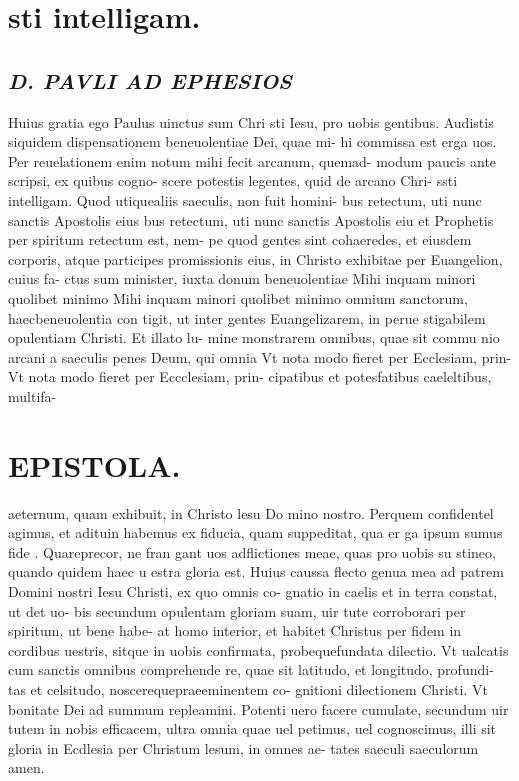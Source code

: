 \documentclass{article}
\begin{document}
\begin{pages}
\section*{sti intelligam. }
\marginpar{[ p.1. ]}
{}
\subsection*{\textit{D. PAVLI AD EPHESIOS }}\pstart Huius gratia ego Paulus uinctus sum Chri sti Iesu, pro uobis gentibus.  Audistis siquidem dispensationem beneuolentiae Dei, quae mi- hi commissa est erga uos. Per reuelationem enim notum mihi fecit arcanum, quemad- modum paucis ante scripsi, ex quibus  cogno- scere potestis legentes, quid de arcano Chri- ssti intelligam.  \pend\pstart Quod utiquealiis saeculis, non fuit homini- bus retectum, uti nunc sanctis Apostolis eius bus retectum, uti nunc sanctis Apostolis eiu et Prophetis per spiritum retectum est, nem- pe quod gentes sint cohaeredes, et eiusdem corporis, atque participes promissionis eius, in Christo exhibitae per Euangelion, cuius fa- ctus sum minister, iuxta donum beneuolentiae  \pend\pstart Mihi inquam minori quolibet minimo Mihi inquam minori quolibet minimo omnium sanctorum, haecbeneuolentia con tigit, ut inter gentes Euangelizarem, in perue stigabilem opulentiam Christi. Et illato lu- mine monstrarem omnibus, quae sit commu nio arcani a saeculis penes Deum, qui omnia  \pend\pstart Vt nota modo fieret per Ecclesiam, prin- Vt nota modo fieret per Eccclesiam, prin- cipatibus et potesfatibus caeleltibus, multifa-  \pend
\section*{EPISTOLA.  }
\marginpar{[ p.12 ]}
\marginpar{[ p.5.  ]}
\marginpar{[ p.6.  ]}
\marginpar{[ p.7. ]}
\marginpar{[ p.8. ]}
\marginpar{[ p.9. ]}\pstart aeternum, quam exhibuit, in Christo lesu Do mino nostro.  \pend\pstart Perquem confidentel agimus, et adituin habemus ex fiducia, quam suppeditat, qua er ga ipsum sumus fide . Quareprecor, ne fran gant uos adflictiones meae, quas pro uobis su stineo, quando quidem haec u estra gloria est.  \pend\pstart Huius caussa flecto genua mea ad patrem Domini nostri Iesu Christi, ex quo omnis co- gnatio in caelis et in terra constat, ut det uo- bis secundum opulentam gloriam suam, uir tute corroborari per spiritum, ut bene habe- at homo interior, et habitet Christus per fidem in cordibus uestris, sitque in uobis confirmata, probequefundata dilectio.  \pend\pstart Vt ualcatis cum sanctis omnibus comprehende re, quae sit latitudo, et longitudo, profundi- tas et celsitudo, noscerequepraeeminentem co- gnitioni dilectionem Christi. Vt bonitate Dei ad summum repleamini.  \pend\pstart Potenti uero facere cumulate, secundum uir tutem in nobis efficacem, ultra omnia quae uel petimus, uel cognoscimus, illi sit gloria in Ecdlesia per Christum lesum, in omnes ae- tates saeculi saeculorum amen.  \pend

\end{pages}
\end{document}

